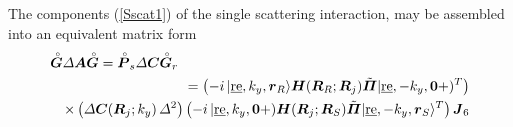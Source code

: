 The components (\ref{Sscat1}) of the single scattering interaction, may be 
assembled into an equivalent matrix form
\begin{eqnarray} \label{Sscat1mat}
\lefteqn{{\rf{\bmi G}}{\mit \Delta} {\bmi A} {\rf{\bmi G}}= {\rf{\bmi 
P}_{s}}{\mit \Delta} {\bmi C} {\rf{\bmi G}_{r}}}\nonumber\\
&&=\left(-i\,|\re,k_y,{\bmi r}_R\rangle {\bmi  H}({\bmi  R}_{R};{\bmi  R}_{j})
	\tilde{\bmi \Pi}|\re,-k_y,{\bf 0}+)^{T}\right)\nonumber\\
&&\times\left({\mit \Delta}{\bmi C}({\bmi R}_j;k_y)\,{\mit \Delta}^2  \right)
\left( -i\,|\re,k_y,{\bf 0}+) {\bmi  H}({\bmi  R}_{j};{\bmi  R}_{S})
	\tilde{\bmi \Pi}|\re,-k_y,{\bmi r}_S\rangle^{T}\right){\bmi 
	J}_{6}
\end{eqnarray}












